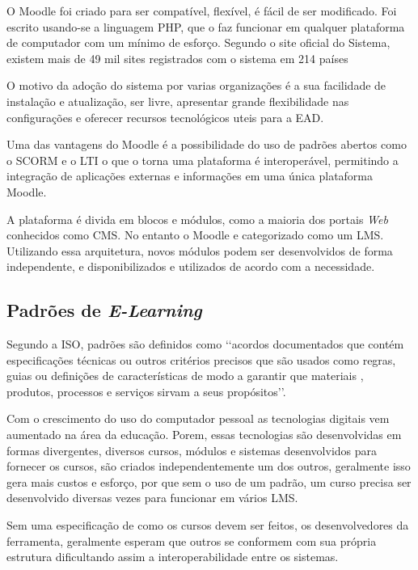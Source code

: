 O \ac{Moodle} foi criado para ser compatível, flexível, é fácil de ser modificado. Foi escrito usando-se a linguagem \ac{PHP}, que o faz funcionar em qualquer plataforma de computador com um mínimo de esforço. Segundo o site oficial do Sistema, existem mais de 49 mil sites registrados com o sistema em 214 países \cite{moodle-stats}

O motivo da adoção do sistema por varias organizações é a sua facilidade de instalação e atualização, ser livre, apresentar grande flexibilidade nas configurações e oferecer recursos tecnológicos uteis para a EAD.

Uma das vantagens do \ac{Moodle} é a possibilidade do uso de padrões abertos como o \ac{SCORM} e o \ac{LTI} o que o torna uma plataforma é interoperável, permitindo a integração de aplicações externas e informações em uma única plataforma \ac{Moodle}.

A plataforma é divida em blocos e módulos, como a maioria dos portais \textit{Web} conhecidos como \ac{CMS}. No entanto o \ac{Moodle} e categorizado como um \ac{LMS}. Utilizando essa arquitetura, novos módulos podem ser desenvolvidos de forma independente, e disponibilizados e utilizados de acordo com a necessidade.

\subsection{Padrões de \textit{E-Learning}}
Segundo a ISO, padrões são definidos como \lq\lq acordos documentados que contém especificações técnicas ou outros critérios precisos que são usados como regras, guias ou definições de características de modo a garantir que materiais , produtos, processos e serviços sirvam a seus propósitos\rq\rq.

Com o crescimento do uso do computador pessoal as tecnologias digitais vem aumentado na área da educação. Porem, essas tecnologias são desenvolvidas em formas divergentes, diversos cursos, módulos e sistemas desenvolvidos para fornecer os cursos, são criados independentemente um dos outros, geralmente isso gera mais custos e esforço, por que sem o uso de um padrão, um curso precisa ser desenvolvido diversas vezes para funcionar em vários \ac{LMS}.

Sem uma especificação de como os cursos devem ser feitos, os desenvolvedores da ferramenta, geralmente esperam que outros se conformem com sua própria estrutura dificultando assim a interoperabilidade entre os sistemas.

